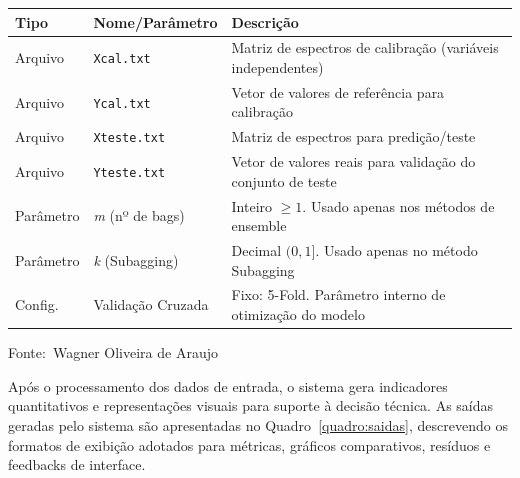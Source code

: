 \documentclass[12pt,a4paper]{article}
\newcommand{\oautor}{Wagner Oliveira de Araujo}
\begin{document}
\begin{quadro}[ht]
\centering
\small
\caption{Entradas necessárias para execução do sistema}
\label{quadro:entradas}
\begin{threeparttable}
\begin{tabularx}{\textwidth}{|l|l|X|} \hline
\textbf{Tipo} & \textbf{Nome/Parâmetro} & \textbf{Descrição} \\ \hline
Arquivo & \texttt{Xcal.txt} & Matriz de espectros de calibração (variáveis independentes) \\ \hline
Arquivo & \texttt{Ycal.txt} & Vetor de valores de referência para calibração \\ \hline
Arquivo & \texttt{Xteste.txt} & Matriz de espectros para predição/teste \\ \hline
Arquivo & \texttt{Yteste.txt} & Vetor de valores reais para validação do conjunto de teste \\ \hline
Parâmetro & \textit{m} (nº de bags) & Inteiro $\ge 1$. Usado apenas nos métodos de ensemble \\ \hline
Parâmetro & \textit{k} (Subagging) & Decimal $(0, 1]$. Usado apenas no método Subagging \\ \hline
Config. & Validação Cruzada & Fixo: 5-Fold. Parâmetro interno de otimização do modelo \\ \hline
\end{tabularx}
\begin{tablenotes}[flushleft]
\footnotesize
\item Fonte:~\oautor
\end{tablenotes}
\end{threeparttable}
\end{quadro}

Após o processamento dos dados de entrada, o sistema gera indicadores quantitativos e representações visuais para suporte à decisão técnica. As saídas geradas pelo sistema são apresentadas no Quadro~\ref{quadro:saidas}, descrevendo os formatos de exibição adotados para métricas, gráficos comparativos, resíduos e feedbacks de interface.
\end{document}
